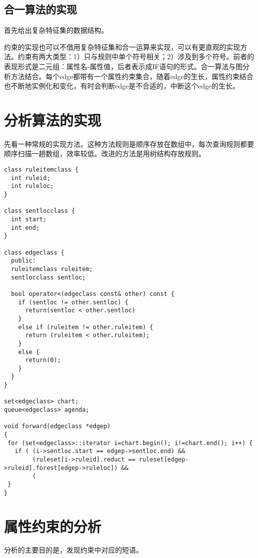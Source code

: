 \documentclass{article}
\begin{document}
\begin{CJK}{UTF8}{gbsn}
\subsection{合一算法的实现}

首先给出复杂特征集的数据结构。

约束的实现也可以不借用复杂特征集和合一运算来实现，可以有更直观的实现方法。约束有两大类型：1）只与规则中单个符号相关；2）涉及到多个符号。前者的表现形式是二元组：属性名-属性值，后者表示成IF语句的形式。合一算法与图分析方法结合。每个edge都带有一个属性约束集合，随着edge的生长，属性约束结合也不断地实例化和变化，有时会判断edge是不合适的，中断这个edge的生长。

\section{分析算法的实现}

先看一种常规的实现方法。这种方法规则是顺序存放在数组中，每次查询规则都要顺序扫描一趟数组，效率较低。改进的方法是用树结构存放规则。

\begin{verbatim}
class ruleitemclass {
  int ruleid;
  int ruleloc;
}

class sentlocclass {
  int start;
  int end;
}

class edgeclass {
  public:
  ruleitemclass ruleitem;
  sentlocclass sentloc;

  bool operator<(edgeclass const& other) const {
    if (sentloc != other.sentloc) {
      return(sentloc < other.sentloc)
    }
    else if (ruleitem != other.ruleitem) {
      return (ruleitem < other.ruleitem);
    }
    else {
      return(0);
    }
  }
}

set<edgeclass> chart;
queue<edgeclass> agenda;

void forward(edgeclass *edgep)
{
 for (set<edgeclass>::iterator i=chart.begin(); i!=chart.end(); i++) {
   if ( (i->sentloc.start == edgep->sentloc.end) &&
        (ruleset[i->ruleid].reduct == ruleset[edgep->ruleid].forest[edgep->ruleloc]) &&
        (
 } 
}
\end{verbatim}

\section{属性约束的分析}

分析的主要目的是，发现约束中对应的短语。

\begin{figure}
  \begin{center}
    \begin{tikzpicture}[->, >=stealth, shorten >=1pt, auto, node distance=2cm, semithick, inner sep=2pt, bend angle=30]
      

\end{tikzpicture}
\end{center}
\end{figure}
\end{CJK}
\end{document}
